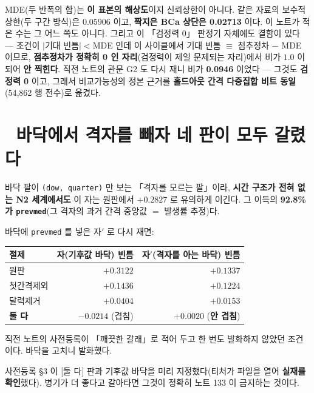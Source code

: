 \documentclass{article}
\begin{document}
{MDE(두 반폭의 합)는 \textbf{이 표본의 해상도}이지 신뢰상한이 아니다.
같은 자료의 보수적 상한(두 구간 방식)은 $0.05906$ 이고, \textbf{짝지은 BCa 상단은 0.02713} 이다.
이 노트가 적은 수는 그 어느 쪽도 아니다.}
그리고 이 「검정력 0」 판정기 자체에도 결함이 있다 ---
조건이 $|$기대 빈틈$| < $MDE 인데 이 사이클에서 기대 빈틈 $\equiv$ 점추정차 $-$ MDE 이므로,
\textbf{점추정차가 정확히 0 인 자리}(검정력이 제일 문제되는 자리)에서 비가 $1.0$ 이 되어 \textbf{안 찍힌다}.
직전 노트의 관문 G2 도 다시 재니 비가 \textbf{0.0946} 이었다 --- 그것도 \textbf{검정력 0} 이고,
그래서 비교가능성의 정본 근거를 \textbf{홀드아웃 간격 다중집합 비트 동일}(54{,}862 행 전수)로 옮겼다.

\section{🔴 바닥에서 격자를 빼자 네 판이 모두 갈렸다}

바닥 팔이 \texttt{(dow, quarter)} 만 보는 「격자를 모르는 팔」이라,
\textbf{시간 구조가 전혀 없는 N2 세계에서도} 이 자는 원판에서 $+0.2827$ 로 유의하게 이긴다.
그 이득의 \textbf{92.8\%가 \texttt{prevmed}}(그 격자의 과거 간격 중앙값 $=$ 발생률 추정)다.

바닥에 \texttt{prevmed} 를 넣은 자$'$ 로 다시 재면:

\begin{table}[h]\centering\small
\begin{tabular}{lrr}
\toprule
절제 & 자(기후값 바닥) 빈틈 & 자$'$(격자를 아는 바닥) 빈틈 \\
\midrule
원판 & $+0.3122$ & $+0.1337$ \\
첫간격제외 & $+0.1436$ & $+0.1224$ \\
달력제거 & $+0.0404$ & $+0.0153$ \\
\textbf{둘 다} & $\mathbf{-0.0214}$ (겹침) & $\mathbf{+0.0020}$ (\textbf{안 겹침}) \\
\bottomrule
\end{tabular}
\end{table}

{직전 노트의 사전등록이 「깨끗한 갈래」로 적어 두고 한 번도 발화하지 않았던 조건이다.
바닥을 고치니 발화했다.}

{사전등록 §3 이 [둘 다] 판과 기후값 바닥을 미리 지정했다(티처가 파일을 열어 \textbf{실재를 확인}했다).
병기가 더 좋다고 갈아타면 그것이 정확히 노트 133 이 금지하는 것이다.}
\end{document}
